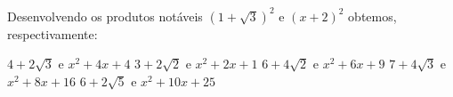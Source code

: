 Desenvolvendo os produtos notáveis $(1+\sqrt{3})^2$ e $(x+2)^2$ obtemos, respectivamente:

$4+2\sqrt{3}$ e $x^2+4x+4$
$3+2\sqrt{2}$ e $x^2+2x+1$
$6+4\sqrt{2}$ e $x^2+6x+9$
$7+4\sqrt{3}$ e $x^2+8x+16$
$6+2\sqrt{5}$ e $x^2+10x+25$


